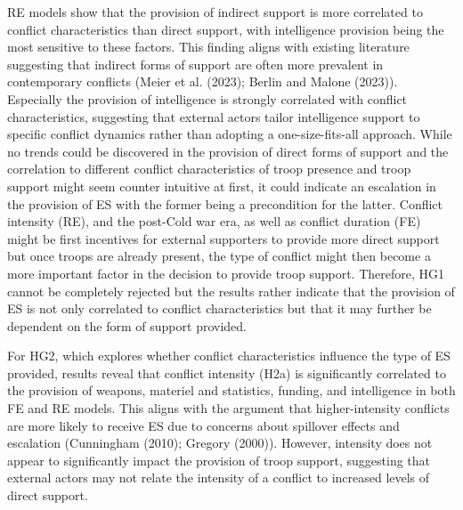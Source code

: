 \documentclass[
]{article}
\begin{document}
RE models show that the provision of indirect support is more correlated
to conflict characteristics than direct support, with intelligence
provision being the most sensitive to these factors. This finding aligns
with existing literature suggesting that indirect forms of support are
often more prevalent in contemporary conflicts (Meier et al. (2023);
Berlin and Malone (2023)). Especially the provision of intelligence is
strongly correlated with conflict characteristics, suggesting that
external actors tailor intelligence support to specific conflict
dynamics rather than adopting a one-size-fits-all approach. While no
trends could be discovered in the provision of direct forms of support
and the correlation to different conflict characteristics of troop
presence and troop support might seem counter intuitive at first, it
could indicate an escalation in the provision of ES with the former
being a precondition for the latter. Conflict intensity (RE), and the
post-Cold war era, as well as conflict duration (FE) might be first
incentives for external supporters to provide more direct support but
once troops are already present, the type of conflict might then become
a more important factor in the decision to provide troop support.
Therefore, HG1 cannot be completely rejected but the results rather
indicate that the provision of ES is not only correlated to conflict
characteristics but that it may further be dependent on the form of
support provided.

For HG2, which explores whether conflict characteristics influence the
type of ES provided, results reveal that conflict intensity (H2a) is
significantly correlated to the provision of weapons, materiel and
statistics, funding, and intelligence in both FE and RE models. This
aligns with the argument that higher-intensity conflicts are more likely
to receive ES due to concerns about spillover effects and escalation
(Cunningham (2010); Gregory (2000)). However, intensity does not appear
to significantly impact the provision of troop support, suggesting that
external actors may not relate the intensity of a conflict to increased
levels of direct support.
\end{document}

